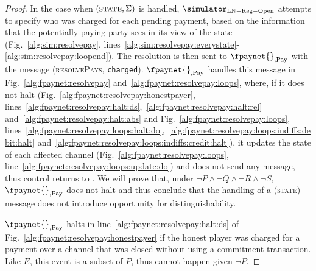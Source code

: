 \begin{proof}
  In the case when $\left(\textsc{state}, \Sigma\right)$ is handled,
  $\simulator_{\mathrm{LN - Reg - Open}}$ attempts to specify who was charged
  for each pending payment, based on the information that the potentially paying
  party sees in its view of the \ledger{} state (Fig.~\ref{alg:sim:resolvepay},
  lines~\ref{alg:sim:resolvepay:everystate}-\ref{alg:sim:resolvepay:loopend}).
  The resolution is then sent to $\fpaynet{}_{\mathrm{, Pay}}$ with the message
  (\textsc{resolvePays}, \texttt{charged}). $\fpaynet{}_{\mathrm{, Pay}}$
  handles this message in Fig.~\ref{alg:fpaynet:resolvepay}
  and~\ref{alg:fpaynet:resolvepay:loops}, where, if it does not halt
  (Fig.~\ref{alg:fpaynet:resolvepay:honestpayer},
  lines~\ref{alg:fpaynet:resolvepay:halt:ds},~\ref{alg:fpaynet:resolvepay:halt:rel}
  and~\ref{alg:fpaynet:resolvepay:halt:abs} and
  Fig.~\ref{alg:fpaynet:resolvepay:loops},
  lines~\ref{alg:fpaynet:resolvepay:loops:halt:do},~\ref{alg:fpaynet:resolvepay:loops:indiffs:debit:halt}
  and~\ref{alg:fpaynet:resolvepay:loops:indiffs:credit:halt}), it
  updates the state of each affected channel
  (Fig.~\ref{alg:fpaynet:resolvepay:loops},
  line~\ref{alg:fpaynet:resolvepay:loops:update:do}) and does not send any
  message, thus control returns to \environment. We will prove that, under $\neg
  P \wedge \neg Q \wedge \neg R \wedge \neg S$, $\fpaynet{}_{\mathrm{, Pay}}$
  does not halt and thus conclude that the handling of a (\textsc{state})
  message does not introduce opportunity for distinguishability.

  $\fpaynet{}_{\mathrm{, Pay}}$ halts in
  line~\ref{alg:fpaynet:resolvepay:halt:ds} of
  Fig.~\ref{alg:fpaynet:resolvepay:honestpayer} if the honest player \dave{} was
  charged for a payment over a channel that was closed without using a
  commitment transaction. Like $E$, this event is a subset of $P$, thus cannot
  happen given $\neg P$.


\end{proof}
